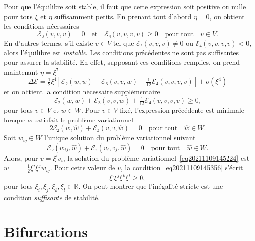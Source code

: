 \documentclass{article}
\newcommand{\tmem}[1]{{\em #1\/}}
\begin{document}
Pour que l'équilibre soit stable, il faut que cette expression soit
positive ou nulle pour tous $ξ$ et $η$ suffisamment petits. En prenant
tout d'abord $η = 0$, on obtient les conditions nécessaires
\begin{equation}
  \label{eq20211108164416} ℰ₃ (v, v, v) = 0 \quad \text{et} \quad
  ℰ₄ (v, v, v, v) \geq 0 \quad \text{pour tout} \quad v∈V.
\end{equation}
En d'autres termes, s'il existe $v∈V$ tel que $ℰ₃ (v, v, v)
\neq 0$ ou $ℰ₄ (v, v, v, v) < 0$, alors l'équilibre est
{\tmem{instable}}. Les conditions précédentes ne sont pas suffisantes
pour assurer la stabilité. En effet, supposant ces conditions remplies, on
prend maintenant $η = ξ^2$
\begin{equation}
  \Delta ℰ= \tfrac{1}{2} ξ^4  \left[ ℰ₂ (w, w)
  +ℰ₃ (v, v, w) + \tfrac{1}{12} ℰ₄ (v, v, v, v) \right]
  + o (ξ^4)
\end{equation}
et on obtient la condition nécessaire supplémentaire
\begin{equation}
  \label{eq20211109145356} ℰ₂ (w, w) +ℰ₃ (v, v, w) +
  \tfrac{1}{12} ℰ₄ (v, v, v, v) \geq 0,
\end{equation}
pour tous $v∈V$ et $w∈W$. Pour $v∈V$ fixé, l'expression
précédente est minimale lorsque $w$ satisfait le problème
variationnel
\begin{equation}
  \label{eq20211109145224} 2ℰ₂ (w, \hat{w}) +ℰ₃ (v, v,
  \hat{w}) = 0 \quad \text{pour tout} \quad \hat{w}∈W.
\end{equation}
Soit $w_{i  j}∈W$ l'unique solution du problème variationnel
suivant
\begin{equation}
  \label{eq:pbvar wij} ℰ₂ (w_{i  j}, \hat{w})
  +ℰ₃ (v_i, v_j, \hat{w}) = 0 \quad \text{pour tout} \quad \hat{w}
 ∈W.
\end{equation}
Alors, pour $v = ξ^i v_i$, la solution du problème
variationnel~\eqref{eq20211109145224} est $w = = \tfrac{1}{2} ξ^i ξ^j w_{i
 j}$. Pour cette valeur de $v$, la condition~\eqref{eq20211109145356}
s'écrit
\begin{equation}
  [ℰ₄ (v_i, v_j, v_k, v_l) - 3ℰ₂ (w_{i  j}, w_{k
   l})] ξ^i ξ^j ξ^k ξ^l \geq 0,
\end{equation}
pour tous $ξ_i, ξ_j, ξ_k, ξ_l∈\mathbb{R}$. On peut montrer que
l'inégalité stricte est une condition {\tmem{suffisante}} de
stabilité.

\section{Bifurcations}
\end{document}

